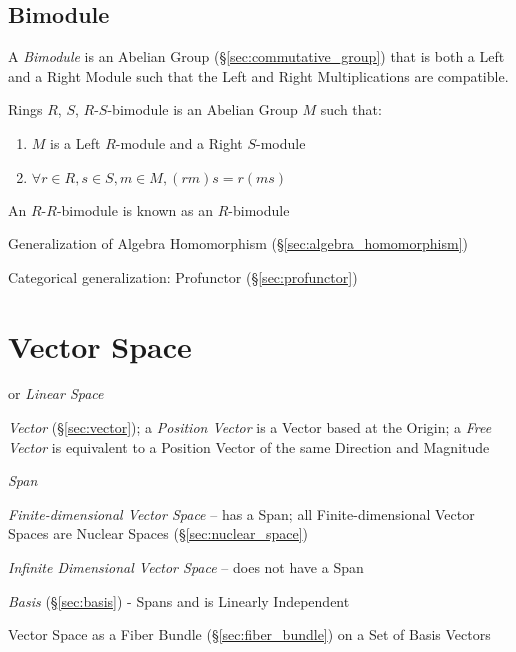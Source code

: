 \subsection{Bimodule}\label{sec:bimodule}

A \emph{Bimodule} is an Abelian Group (\S\ref{sec:commutative_group}) that is
both a Left and a Right Module such that the Left and Right Multiplications are
compatible.

Rings $R$, $S$, $R$-$S$-bimodule is an Abelian Group $M$ such that:

\begin{enumerate}
\item $M$ is a Left $R$-module and a Right $S$-module
\item $\forall r \in R, s \in S, m \in M, (rm)s = r(ms)$
\end{enumerate}

An $R$-$R$-bimodule is known as an $R$-bimodule

Generalization of Algebra Homomorphism
(\S\ref{sec:algebra_homomorphism})

Categorical generalization: Profunctor (\S\ref{sec:profunctor})



\section{Vector Space}\label{sec:vector_space}

or \emph{Linear Space}

\emph{Vector} (\S\ref{sec:vector}); a \emph{Position Vector} is a Vector based
at the Origin; a \emph{Free Vector} is equivalent to a Position Vector of the
same Direction and Magnitude

\emph{Span}

\emph{Finite-dimensional Vector Space} -- has a Span; all
Finite-dimensional Vector Spaces are Nuclear Spaces
(\S\ref{sec:nuclear_space})

\emph{Infinite Dimensional Vector Space} -- does not have a Span

\emph{Basis} (\S\ref{sec:basis}) - Spans and is Linearly Independent

Vector Space as a Fiber Bundle (\S\ref{sec:fiber_bundle}) on a Set of Basis
Vectors

